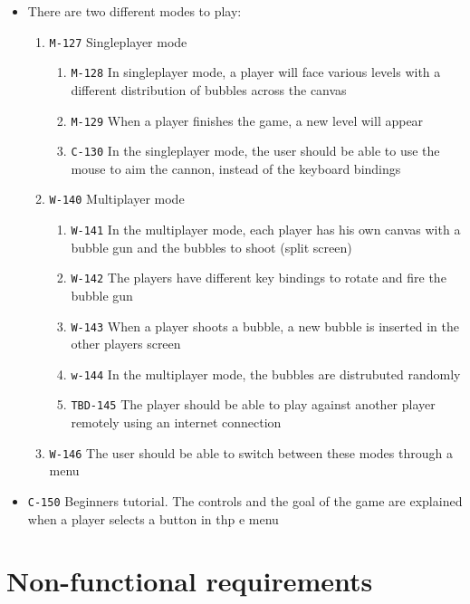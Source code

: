 \documentclass[a4paper]{article}
\begin{document}
\begin{itemize}
  \item There are two different modes to play:
  \begin{enumerate}
      \item \texttt{M-127} Singleplayer mode
      \begin{enumerate}
          \item \texttt{M-128} In singleplayer mode, a player will face various levels with a different distribution of bubbles across the canvas
          \item \texttt{M-129} When a player finishes the game, a new level will appear
          \item \texttt{C-130} In the singleplayer mode, the user should be able to use the mouse to aim the cannon, instead of the keyboard bindings
      \end{enumerate}
      
      \item \texttt{W-140} Multiplayer mode
      \begin{enumerate}
          \item \texttt{W-141} In the multiplayer mode, each player has his own canvas with a bubble gun and the bubbles to shoot (split screen)
          \item \texttt{W-142} The players have different key bindings to rotate and fire the bubble gun
          \item \texttt{W-143} When a player shoots a bubble, a new bubble is inserted in the other players screen
          \item \texttt{w-144} In the multiplayer mode, the bubbles are distrubuted randomly
          \item \texttt{TBD-145} The player should be able to play against another player remotely using an internet connection
      \end{enumerate}
      
      \item \texttt{W-146} The user should be able to switch between these modes through a menu
  \end{enumerate}
  \item \texttt{C-150} Beginners tutorial. The controls and the goal of the game are explained when a player selects a button in thp
  e menu
\end{itemize}

\section{Non-functional requirements}
\end{document}
